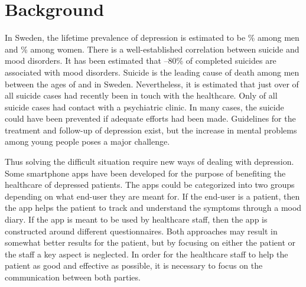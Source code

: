 \documentclass[12pt,a4paper,oneside]{article}
\let\oldcite\cite
\renewcommand*\cite[1]{\textsuperscript{\oldcite{#1}}}
\begin{document}
\section*{Background}
In Sweden, the lifetime prevalence of depression is estimated to be {}\% among men and {}\% among women\cite{numbers0}. There is a well-established correlation between suicide and mood disorders\cite{numbers1.1}. It has been estimated that {--80}\% of completed suicides are associated with mood disorders\cite{numbers1.1}. Suicide is the leading cause of death among men between the ages of {} and {} in Sweden\cite{numbers3.0.1}. Nevertheless, it is estimated that just over  of all suicide cases had recently been in touch with the healthcare. Only  of all suicide cases had contact with a psychiatric clinic\cite{numbers2}. In many cases, the suicide could have been prevented if adequate efforts had been made\cite{numbers1}. Guidelines for the treatment and follow-up of depression exist, but the increase in mental problems among young people poses a major challenge\cite{guide1, regionjh1}.

Thus solving the difficult situation require new ways of dealing with depression. Some smartphone apps have been developed for the purpose of benefiting the healthcare of depressed patients. The apps could be categorized into two groups depending on what end-user they are meant for. If the end-user is a patient, then the app helps the patient to track and understand the symptoms through a mood diary\cite{app1}. If the app is meant to be used by healthcare staff, then the app is constructed around different questionnaires\cite{app2}. Both approaches may result in somewhat better results for the patient, but by focusing on either the patient or the staff a key aspect is neglected. In order for the healthcare staff to help the patient as good and effective as possible, it is necessary to focus on the communication between both parties.
\end{document}
